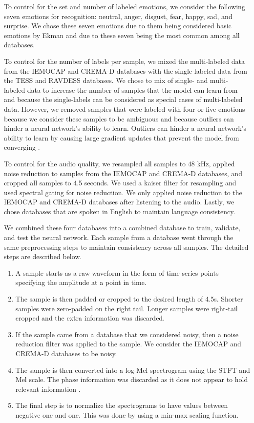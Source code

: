 \documentclass[a4paper, 10pt, conference]{ieeeconf}      %
\begin{document}
To control for the set and number of labeled emotions, we consider the following seven emotions for recognition: neutral, anger, disgust, fear, happy, sad, and surprise. We chose these seven emotions due to them being considered basic emotions by Ekman \cite{Ekman1992} and due to these seven being the most common among all databases. 

To control for the number of labels per sample, we mixed the multi-labeled data from the IEMOCAP and CREMA-D databases with the single-labeled data from the TESS and RAVDESS databases. We chose to mix of single- and multi- labeled data to increase the number of samples that the model can learn from and because the single-labels can be considered as special cases of multi-labeled data. However, we removed samples that were labeled with four or five emotions because we consider these samples to be ambiguous and because outliers can hinder a neural network's ability to learn. Outliers can hinder a neural network's ability to learn by causing large gradient updates that prevent the model from converging \cite{Chollet2017}.

To control for the audio quality, we resampled all samples to 48 kHz, applied noise reduction to samples from the IEMOCAP and CREMA-D databases, and cropped all samples to 4.5 seconds. We used a kaiser filter for resampling and used spectral gating for noise reduction. We only applied noise reduction to the IEMOCAP and CREMA-D databases after listening to the audio. Lastly, we chose databases that are spoken in English to maintain language consistency.

We combined these four databases into a combined database to train, validate, and test the neural network. Each sample from a database went through the same preprocessing steps to maintain consistency across all samples. The detailed steps are described below.
\begin{enumerate}
	\item A sample starts as a raw waveform in the form of time series points specifying the amplitude at a point in time.
	\item The sample is then padded or cropped to the desired length of 4.5s. Shorter samples were zero-padded on the right tail. Longer samples were right-tail cropped and the extra information was discarded.
	\item If the sample came from a database that we considered noisy, then a noise reduction filter was applied to the sample. We consider the IEMOCAP and CREMA-D databases to be noisy.
	\item The sample is then converted into a log-Mel spectrogram using the STFT and Mel scale. The phase information was discarded as it does not appear to hold relevant information \cite{Kozakowski2017}.
	\item The final step is to normalize the spectrograms to have values between negative one and one. This was done by using a min-max scaling function.
\end{enumerate}
\end{document}
